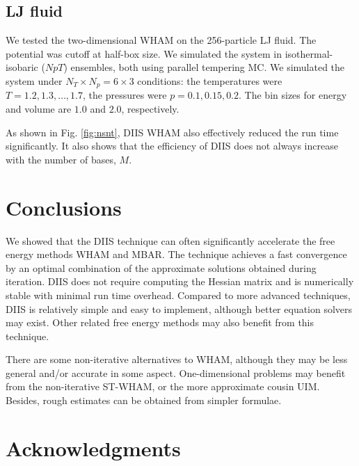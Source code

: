 \documentclass[reprint,aip,jcp,superscriptaddress]{revtex4-1}
\begin{document}
\subsection{\label{sec:results_LJ}
LJ fluid}


We tested the two-dimensional WHAM
on the 256-particle LJ fluid.
%
The potential was cutoff at half-box size.
%
We simulated the system in isothermal-isobaric ($NpT$) ensembles,
both using parallel tempering MC.
%
We simulated the system
under $N_T \times N_p = 6\times 3$ conditions:
the temperatures were $T = 1.2, 1.3, \dots, 1.7$,
the pressures were $p = 0.1, 0.15, 0.2$.
%
The bin sizes for energy and volume
are $1.0$ and $2.0$, respectively.


As shown in Fig. \ref{fig:nsnt},
DIIS WHAM also effectively
reduced the run time significantly.
%
It also shows that
the efficiency of DIIS does not
always increase with
the number of bases, $M$.




\section{Conclusions}



We showed that the DIIS technique
can often significantly accelerate
the free energy methods WHAM and MBAR.
%
The technique achieves a fast convergence
by an optimal combination of the approximate
solutions obtained during iteration.
%
DIIS does not require computing the Hessian matrix
and is numerically stable
with minimal run time overhead.
%
Compared to more advanced techniques\cite{
shirts2008, zhu2012},
DIIS is relatively simple and easy to implement,
although better equation solvers may exist.
%
Other related free energy methods
may also benefit from this technique\cite{
shen1991, woolf1994, *crouzy1994, roux1995}.



There are some non-iterative alternatives to WHAM,
although they may be less general and/or accurate
in some aspect.
%
One-dimensional problems
may benefit from the non-iterative ST-WHAM,
or the more approximate cousin UIM.
%
Besides,
rough estimates
can be obtained from simpler formulae.




\section{Acknowledgments}
\end{document}
